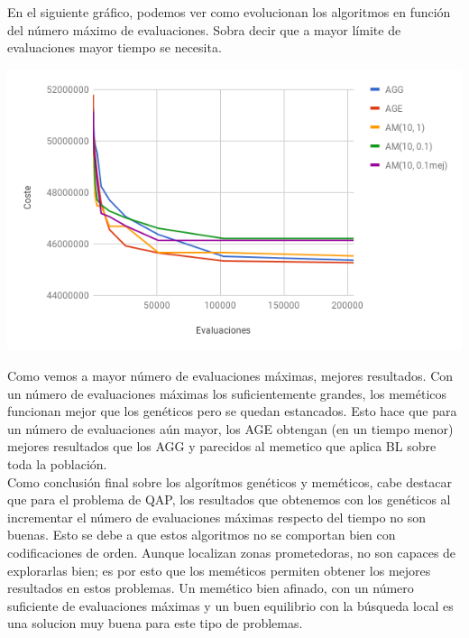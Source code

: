\documentclass[a4paper, 12pt]{article}
\begin{document}
	\newpage
	En el siguiente gráfico, podemos ver como evolucionan los algoritmos en función del número máximo de evaluaciones. Sobra decir que a mayor límite de evaluaciones mayor tiempo se necesita.\\
	
	\begin{center}
         \includegraphics[scale=0.7]{evals-vs-coste}
      \end{center}
      
      Como vemos a mayor número de evaluaciones máximas, mejores resultados. Con un número de evaluaciones máximas los suficientemente grandes, los meméticos funcionan mejor que los genéticos pero se quedan estancados. Esto hace que para un número de evaluaciones aún mayor, los AGE obtengan (en un tiempo menor) mejores resultados que los AGG y parecidos al memetico que aplica BL sobre toda la población.\\
      
      Como conclusión final sobre los algorítmos genéticos y meméticos, cabe destacar que para el problema de QAP, los resultados que obtenemos con los genéticos al incrementar el número de evaluaciones máximas respecto del tiempo no son buenas. Esto se debe a que estos algoritmos no se comportan bien con codificaciones de orden. Aunque localizan zonas prometedoras, no son capaces de explorarlas bien; es por esto que los meméticos permiten obtener los mejores resultados en estos problemas. Un memético bien afinado, con un número suficiente de evaluaciones máximas y un buen equilibrio con la búsqueda local es una solucion muy buena para este tipo de problemas. 
      
      
	
	

	
      
      
      
   
\printindex
\end{document}
